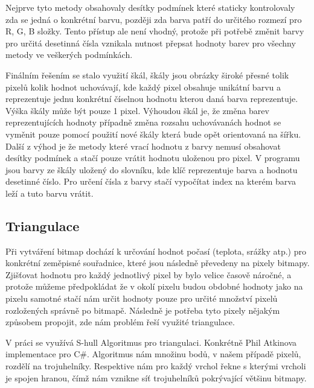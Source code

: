 \documentclass[czech,bachelor,dept460,male,csharp,cpdeclaration]{diploma}
\begin{document}
	Nejprve tyto metody obsahovaly desítky podmínek které staticky kontrolovaly zda se jedná o konkrétní barvu, později zda barva patří do určitého rozmezí pro R, G, B složky. Tento přístup ale není vhodný, protože při potřebě změnit barvy pro určitá desetinná čísla vznikala nutnost přepsat hodnoty barev pro všechny metody ve veškerých podmínkách.
	
	Finálním řešením se stalo využití škál, škály jsou obrázky široké přesné tolik pixelů kolik hodnot uchovávají, kde každý pixel obsahuje unikátní barvu a reprezentuje jednu konkrétní číselnou hodnotu kterou daná barva reprezentuje. Výška škály může být pouze 1 pixel. Výhoudou škál je, že změna barev reprezentujících hodnoty případně změna rozsahu uchovávanách hodnot se vyměnit pouze pomocí použití nové škály která bude opět orientovaná na šířku. Další z výhod je že metody které vrací hodnotu z barvy nemusí obsahovat desítky podmínek a stačí pouze vrátit hodnotu uloženou pro pixel. V programu jsou barvy ze škály uložený do slovníku, kde klíč reprezentuje barva a hodnotu desetinné číslo. Pro určení čísla z barvy stačí vypočítat index na kterém barva leží a tuto barvu vrátit.
	
	\subsection{Triangulace}
	
	Při vytváření bitmap dochází k určování hodnot počasí (teplota, srážky atp.) pro konkrétní zeměpisné souřadnice, které jsou následně převedeny na pixely bitmapy. Zjišťovat hodnotu pro každý jednotlivý pixel by bylo velice časově náročné, a protože můžeme předpokládat že v okolí pixelu budou obdobné hodnoty jako na pixelu samotné stačí nám určit hodnoty pouze pro určité množství pixelů rozložených správně po bitmapě. Následně je potřeba tyto pixely nějakým způsobem propojit, zde nám problém řeší využité triangulace.
	
	V práci se využívá S-hull Algoritmus pro triangulaci. Konkrétně Phil Atkinova implementace pro C\#. Algoritmus nám množinu bodů, v našem případě pixelů, rozdělí na trojuhelníky. Respektive nám pro každý vrchol řekne s kterými vrcholi je spojen hranou, čímž nám vznikne síť trojuhelníků pokrývající většinu bitmapy.
	
	
\end{document}
